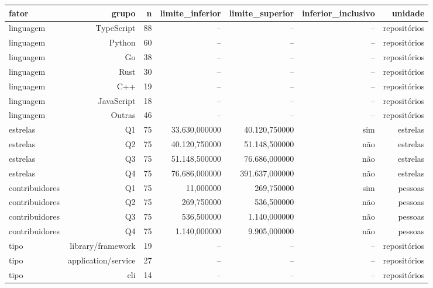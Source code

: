 \begin{tabular}{lrrrrrr}
\hline
fator & grupo & n & limite\_inferior & limite\_superior & inferior\_inclusivo & unidade \\
\hline
linguagem & TypeScript & 88 & -- & -- & -- & repositórios \\
linguagem & Python & 60 & -- & -- & -- & repositórios \\
linguagem & Go & 38 & -- & -- & -- & repositórios \\
linguagem & Rust & 30 & -- & -- & -- & repositórios \\
linguagem & C++ & 19 & -- & -- & -- & repositórios \\
linguagem & JavaScript & 18 & -- & -- & -- & repositórios \\
linguagem & Outras & 46 & -- & -- & -- & repositórios \\
estrelas & Q1 & 75 & 33.630,000000 & 40.120,750000 & sim & estrelas \\
estrelas & Q2 & 75 & 40.120,750000 & 51.148,500000 & não & estrelas \\
estrelas & Q3 & 75 & 51.148,500000 & 76.686,000000 & não & estrelas \\
estrelas & Q4 & 75 & 76.686,000000 & 391.637,000000 & não & estrelas \\
contribuidores & Q1 & 75 & 11,000000 & 269,750000 & sim & pessoas \\
contribuidores & Q2 & 75 & 269,750000 & 536,500000 & não & pessoas \\
contribuidores & Q3 & 75 & 536,500000 & 1.140,000000 & não & pessoas \\
contribuidores & Q4 & 75 & 1.140,000000 & 9.905,000000 & não & pessoas \\
tipo & library/framework & 19 & -- & -- & -- & repositórios \\
tipo & application/service & 27 & -- & -- & -- & repositórios \\
tipo & cli & 14 & -- & -- & -- & repositórios \\
\hline
\end{tabular}
